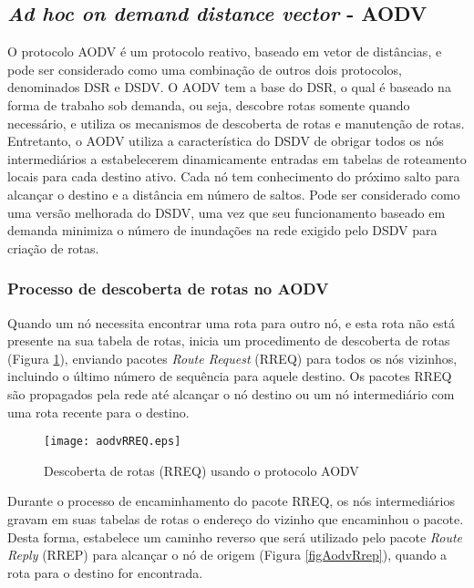 \subsection{\textit{Ad hoc on demand distance vector} - AODV}
O protocolo AODV \'e um protocolo reativo, baseado em vetor de dist\^ancias, e pode ser considerado como uma combina\c{c}\~ao de outros dois protocolos, denominados DSR e DSDV. 
O AODV tem a base do DSR, o qual \'e baseado na forma de trabaho sob demanda, ou seja, descobre rotas somente quando necess\'ario, e utiliza os mecanismos de descoberta de rotas e manuten\c{c}\~ao de rotas.
Entretanto, o AODV utiliza a caracter\'istica do DSDV de obrigar todos os n\'os intermedi\'arios a estabelecerem dinamicamente entradas em tabelas de roteamento locais para cada destino ativo.
Cada n\'o tem conhecimento do pr\'oximo salto para alcan\c{c}ar o destino e a dist\^ancia em n\'umero de saltos.
Pode ser considerado como uma vers\~ao melhorada do DSDV, uma vez que seu funcionamento baseado em demanda minimiza o n\'umero de inunda\c{c}\~oes na rede exigido pelo DSDV para cria\c{c}\~ao de rotas.

\subsubsection{Processo de descoberta de rotas no AODV}
Quando um n\'o necessita encontrar uma rota para outro n\'o, e esta rota n\~ao est\'a presente na sua tabela de rotas, inicia um procedimento de descoberta de rotas (Figura \ref{figAodvRreq}), enviando pacotes \textit{Route Request} (RREQ) para todos os n\'os vizinhos, incluindo o \'ultimo n\'umero de sequ\^encia para aquele destino. 
Os pacotes RREQ s\~ao propagados pela rede at\'e alcan\c{c}ar o n\'o destino ou um n\'o intermedi\'ario com uma rota recente para o destino.

\begin{figure}[H]
	\centering
	\texttt{[image: aodvRREQ.eps]}
	\caption{Descoberta de rotas (RREQ) usando o protocolo AODV \cite{pereira}}
	\label{figAodvRreq}
\end{figure}

Durante o processo de encaminhamento do pacote RREQ, os n\'os intermedi\'arios gravam em suas tabelas de rotas o endere\c{c}o do vizinho que encaminhou o pacote. 
Desta forma, estabelece um caminho reverso que ser\'a utilizado pelo pacote \textit{Route Reply} (RREP) para alcan\c{c}ar o n\'o de origem (Figura \ref{figAodvRrep}), quando a rota para o destino for encontrada.

